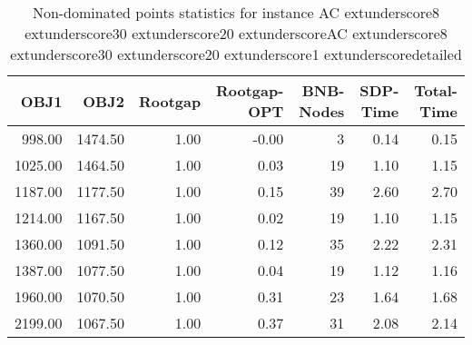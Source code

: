 \begin{table}
\caption{Non-dominated points statistics for instance AC	extunderscore8	extunderscore30	extunderscore20	extunderscoreAC	extunderscore8	extunderscore30	extunderscore20	extunderscore1	extunderscoredetailed}
\label{tab:stats/AC_8_30_20_AC_8_30_20_1_detailed}
\begin{tabular}{rrrrrrr}
\toprule
OBJ1 & OBJ2 & Rootgap & Rootgap-OPT & BNB-Nodes & SDP-Time & Total-Time \\
\midrule
998.00 & 1474.50 & 1.00 & -0.00 & 3 & 0.14 & 0.15 \\
1025.00 & 1464.50 & 1.00 & 0.03 & 19 & 1.10 & 1.15 \\
1187.00 & 1177.50 & 1.00 & 0.15 & 39 & 2.60 & 2.70 \\
1214.00 & 1167.50 & 1.00 & 0.02 & 19 & 1.10 & 1.15 \\
1360.00 & 1091.50 & 1.00 & 0.12 & 35 & 2.22 & 2.31 \\
1387.00 & 1077.50 & 1.00 & 0.04 & 19 & 1.12 & 1.16 \\
1960.00 & 1070.50 & 1.00 & 0.31 & 23 & 1.64 & 1.68 \\
2199.00 & 1067.50 & 1.00 & 0.37 & 31 & 2.08 & 2.14 \\
\bottomrule
\end{tabular}
\end{table}
